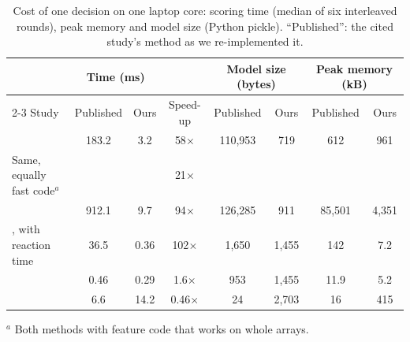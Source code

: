 \begin{table}[!htbp]
\caption{Cost of one decision on one laptop core: scoring time (median of six interleaved rounds), peak memory and model size (Python pickle). ``Published'': the cited study's method as we re-implemented it.}\label{tab:cost}
\footnotesize\setlength{\tabcolsep}{3pt}
\begin{tabular}{@{}lccccccc@{}}
\toprule
 & \multicolumn{2}{c}{Time (ms)} & & \multicolumn{2}{c}{Model size (bytes)} & \multicolumn{2}{c}{Peak memory (kB)} \\
\cmidrule{2-3}\cmidrule{5-6}\cmidrule{7-8}
Study & Published & Ours & Speed-up & Published & Ours & Published & Ours \\
\midrule
\citet{delmas2024} & 183.2 & 3.2 & 58$\times$ & 110,953 & 719 & 612 & 961 \\
Same, equally fast code$^{a}$ & & & 21$\times$ & & & & \\
\citet{celniak2026scirep} & 912.1 & 9.7 & 94$\times$ & 126,285 & 911 & 85,501 & 4,351 \\
\citet{preti2026}, with reaction time & 36.5 & 0.36 & 102$\times$ & 1,650 & 1,455 & 142 & 7.2 \\
\citet{colasanti2024} & 0.46 & 0.29 & 1.6$\times$ & 953 & 1,455 & 11.9 & 5.2 \\
\citet{chen2026} & 6.6 & 14.2 & 0.46$\times$ & 24 & 2,703 & 16 & 415 \\
\bottomrule
\end{tabular}
\begin{flushleft}\scriptsize
$^{a}$ Both methods with feature code that works on whole arrays.
\end{flushleft}
\end{table}
